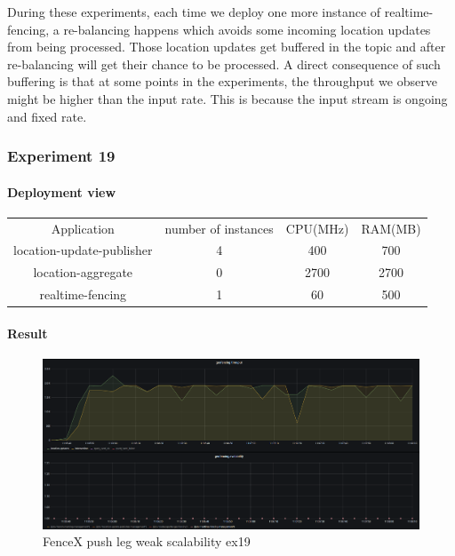 \documentclass[a4]{report}
\begin{document}
    During these experiments, each time we deploy one more instance of realtime-fencing, a re-balancing happens which
    avoids some incoming location updates from being processed.
    Those location updates get buffered in the topic and after re-balancing will get their chance to be processed.
    A direct consequence of such buffering is that at some points in the experiments, the throughput we observe might be
    higher than the input rate.
    This is because the input stream is ongoing and fixed rate.

    \subsubsection{Experiment 19}

    \paragraph{Deployment view}
    \begin{center}
        \begin{tabular}{ c c c c }
            Application               & number of instances & CPU(MHz) & RAM(MB) \\
            location-update-publisher & 4                   & 400      & 700     \\
            location-aggregate        & 0                   & 2700     & 2700    \\
            realtime-fencing          & 1                   & 60       & 500     \\
        \end{tabular}
    \end{center}

    \paragraph{Result}
    \begin{figure}[ht]
        \caption{FenceX push leg weak scalability ex19}
        \label{fig:ex19}
        \includegraphics[scale=0.4]{images/evaluation/ex19-benchmarking-ongoing-1per16sec.png}
    \end{figure}
\end{document}

